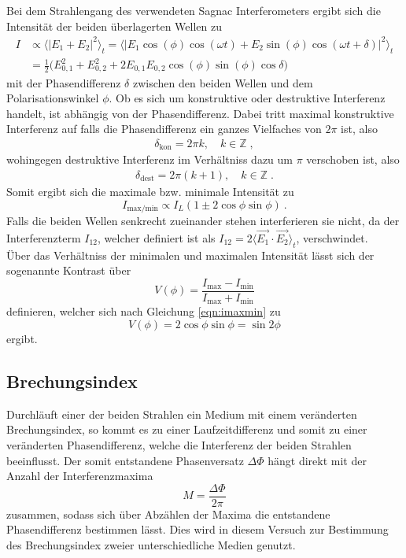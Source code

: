 Bei dem Strahlengang des verwendeten Sagnac Interferometers ergibt sich die Intensität der beiden überlagerten Wellen zu
\begin{align}
  I &\propto \langle \lvert
  E_1+E_2 \rvert^2 \rangle_t =
  \langle \lvert E_1 \cos{(\phi)}\cos{(\omega t)} + E_2 \sin{(\phi)}\cos{(\omega t + \delta)} \rvert^2 \rangle_t \\
  &= \frac{1}{2} \bigl( E_{0,1}^2 + E_{0,2}^2 + 2E_{0,1}E_{0,2}\cos(\phi)\sin(\phi)\cos{\delta} \bigr)
\end{align}
mit der Phasendifferenz $\delta$ zwischen den beiden Wellen und dem  Polarisationswinkel $\phi$.
Ob es sich um konstruktive oder destruktive Interferenz handelt, ist abhängig von der Phasendifferenz.
Dabei tritt maximal konstruktive Interferenz auf falls die Phasendifferenz ein ganzes Vielfaches von $2\pi$
ist, also
\begin{align*}
  \delta_{\text{kon}}=2\pi k, \quad k \in \mathbb{Z} \; ,
\end{align*}
wohingegen destruktive Interferenz im Verhältniss dazu um $\pi$ verschoben ist, also
\begin{align*}
  \delta_{\text{dest}}=2\pi(k+1), \quad k \in \mathbb{Z}  \; .
\end{align*}
Somit ergibt sich die maximale bzw. minimale Intensität zu
\begin{equation}
  I_{\text{max/min}} \propto I_{L}(1\pm 2\cos{\phi}\sin{\phi}) \: .
  \label{eqn:imaxmin}
\end{equation}
Falls die beiden Wellen senkrecht zueinander stehen
interferieren sie nicht, da der Interferenzterm $I_{12}$, welcher definiert ist als
$I_{12}= 2 \langle \vec{E_1} \cdot \vec{E_2} \rangle_t$,
verschwindet.\\
Über das Verhältniss der minimalen und maximalen Intensität lässt sich der sogenannte Kontrast
über
\begin{equation}
  V(\phi)= \frac{I_{\text{max}}-I_{\text{min}}}{I_{\text{max}}+I_{\text{min}}}
  \label{eqn:Kontrasttheo}
\end{equation}
definieren, welcher sich nach Gleichung \eqref{eqn:imaxmin} zu
\begin{equation}
  V(\phi)=2\cos{\phi}\sin{\phi}=\sin{2\phi}
\end{equation}
ergibt.
\subsection{Brechungsindex}

Durchläuft einer der beiden Strahlen ein Medium mit einem veränderten Brechungsindex, so
kommt es zu einer Laufzeitdifferenz und somit zu einer veränderten Phasendifferenz,
welche die Interferenz der beiden Strahlen beeinflusst.
Der somit entstandene Phasenversatz $\Delta \Phi$
hängt direkt mit der Anzahl der Interferenzmaxima
\begin{equation}
  M=\frac{\Delta \Phi}{2\pi}
  \label{eqn:AnzMax}
\end{equation}
zusammen, sodass sich über Abzählen der Maxima die entstandene Phasendifferenz bestimmen lässt.
Dies wird in diesem Versuch zur Bestimmung des Brechungsindex zweier unterschiedliche Medien genutzt.
